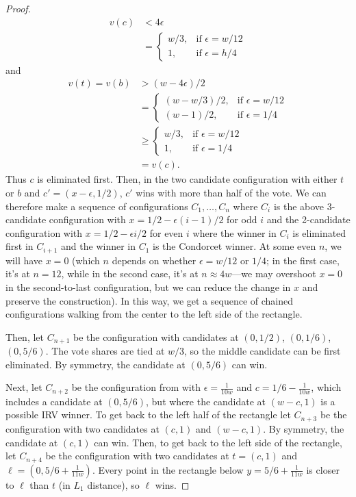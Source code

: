 \documentclass{article}
\theoremstyle{theorem}
\theoremstyle{definition}
\begin{document}
\begin{proof}
  \begin{align*}
    v(c) &< 4\epsilon \\
    &= \begin{cases}
      w /3, &\text{if $\epsilon = w / 12$}\\
      1, &\text{if $\epsilon = h / 4$}
    \end{cases}
  \end{align*}
  and
  \begin{align*}
    v(t) = v(b) &> (w - 4\epsilon)/2 \\
      &= \begin{cases}
      (w - w/3)/2, &\text{if $\epsilon = w / 12$}\\
      (w - 1) /2, &\text{if $\epsilon = 1 / 4$}
    \end{cases}\\
    &\ge \begin{cases}
      w/3, &\text{if $\epsilon = w / 12$}\\
      1, &\text{if $\epsilon = 1 / 4$} \tag{since $w \ge 3$ if $\epsilon = 1/4$}
    \end{cases}\\
    & = v(c).
  \end{align*}
  Thus $c$ is eliminated first. Then, in the two candidate configuration with either $t$ or $b$ and $c' = (x- \epsilon, 1 / 2)$, $c'$ wins with more than half of the vote. We can therefore make a sequence of configurations $C_1, \dots, C_{n}$ where $C_i$ is the above 3-candidate configuration with $x = 1/2 - \epsilon (i - 1) / 2 $ for odd $i$ and the 2-candidate configuration with $x = 1/2 - \epsilon i/2$ for even $i$ where the winner in $C_i$ is eliminated first in $C_{i+1}$ and the winner in $C_1$ is the Condorcet winner. At some even $n$, we will have $x = 0$ (which $n$ depends on whether $\epsilon = w / 12$ or $1/4$; in the first case, it's at $n = 12$, while in the second case, it's at $n \approx 4 w $---we may overshoot $x = 0$ in the second-to-last configuration, but we can  reduce the change in $x$ and preserve the construction). In this way, we get a sequence of chained configurations walking from the center to the left side of the rectangle.
  
  Then, let $C_{n+1}$ be the configuration with candidates at $(0, 1/2)$, $(0, 1/6)$, $(0, 5/6)$. The vote shares are tied at $w/3$, so the middle candidate can be first eliminated.  By symmetry, the candidate at $(0, 5/6)$ can win.
  
  Next, let $C_{n + 2}$ be the configuration from  with $\epsilon = \frac{1}{10w}$ and $c = 1/6 - \frac{1}{10w}$, which includes a candidate at $(0, 5/6)$, but where the candidate at $(w - c, 1)$ is a possible IRV winner. To get back to the left half of the rectangle let $C_{n+3}$ be the configuration with two candidates at $(c, 1)$ and $(w-c, 1)$. By symmetry, the candidate at $(c, 1)$ can win. Then, to get back to the left side of the rectangle, let $C_{n + 4}$ be the configuration with two candidates at $t=(c, 1)$ and $\ell = (0, 5/6 + \frac{1}{11w})$. Every point in the rectangle below $y = 5/6+\frac{1}{11w}$ is closer to $\ell$ than $t$ (in $L_1$ distance), so $\ell$ wins. 
  

\end{proof}
\end{document}

